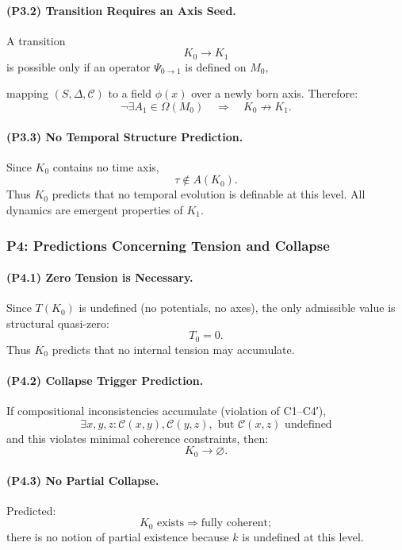 \paragraph{(P3.2) Transition Requires an Axis Seed.}
A transition
\[
K_0 \longrightarrow K_1
\]
is possible only if an operator $\Psi_{0\to1}$ is defined on $M_0$,

mapping $(S,\Delta,\mathcal{C})$ to a field $\phi(x)$ over a newly born axis.
Therefore:
\[
\neg\exists A_1 \in \Omega(M_0)
\quad\Rightarrow\quad
K_0 \not\to K_1.
\]

\paragraph{(P3.3) No Temporal Structure Prediction.}
Since $K_0$ contains no time axis,
\[
\tau \notin A(K_0).
\]
Thus $K_0$ predicts that no temporal evolution is definable at this level.
All dynamics are emergent properties of $K_1$.

\subsubsection{P4: Predictions Concerning Tension and Collapse}

\paragraph{(P4.1) Zero Tension is Necessary.}
Since $T(K_0)$ is undefined (no potentials, no axes),
the only admissible value is structural quasi-zero:
\[
T_0 = 0.
\]
Thus $K_0$ predicts that no internal tension may accumulate.

\paragraph{(P4.2) Collapse Trigger Prediction.}
If compositional inconsistencies accumulate (violation of C1–C4′),
\[
\exists x,y,z: \mathcal{C}(x,y), \mathcal{C}(y,z), \text{ but } \mathcal{C}(x,z) \text{ undefined}
\]
and this violates minimal coherence constraints, then:
\[
K_0 \to \varnothing.
\]

\paragraph{(P4.3) No Partial Collapse.}
Predicted:
\[
K_0 \text{ exists} \Rightarrow \text{fully coherent};
\]
there is no notion of partial existence because $k$ is undefined at this level.


